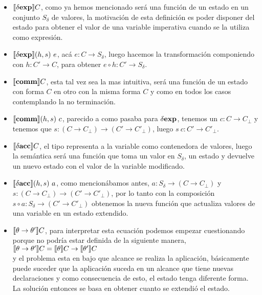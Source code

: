 \begin{itemize}
\item $\llbracket \delta \textbf{exp} \rrbracket C$, como ya hemos mencionado ser\'a una funci\'on 
de un estado en un conjunto $S_\delta$ de valores, la motivaci\'on de 
esta definici\'on es poder disponer del estado para obtener el valor de 
una variable imperativa cuando se la utiliza como expresi\'on.

\item $\llbracket \delta \textbf{exp} \rrbracket(h,s) \ e$, acá $e : C \rightarrow S_\delta$, luego
hacemos la transformaci\'on componiendo con $h : C' \rightarrow C$, para obtener
$e \circ h : C' \rightarrow S_\delta$.

\item $\llbracket \textbf{comm} \rrbracket C$, esta tal vez sea la mas intuitiva, ser\'a
una funci\'on de un estado con forma $C$ en otro con la misma forma $C$ y
como en todos los casos contemplando la no terminaci\'on.

\item $\llbracket \textbf{comm} \rrbracket(h,s) \ c$, parecido a como pasaba para $\delta \textbf{exp}$,
tenemos un $c : C \rightarrow C_\bot$ y tenemos que 
$s : (C \rightarrow C_\bot) \rightarrow (C' \rightarrow C'_\bot)$, luego
$s \ c : C' \rightarrow C'_\bot$.

\item $\llbracket \delta \textbf{acc} \rrbracket C$, el tipo representa a la variable como contenedora
de valores, luego la sem\'antica ser\'a una funci\'on que toma un valor en $S_\delta$,
un estado y devuelve un nuevo estado con el valor de la variable modificado.

\item $\llbracket \delta \textbf{acc} \rrbracket(h,s) \ a$, como mencion\'abamos antes, 
$a : S_\delta \rightarrow (C \rightarrow C_\bot)$ y
$s : (C \rightarrow C_\bot) \rightarrow (C' \rightarrow C'_\bot)$, por lo tanto
con la composici\'on $s \circ a : S_\delta \rightarrow (C' \rightarrow C'_\bot)$
obtenemos la nueva funci\'on que actualiza valores de una variable en un estado
extendido.

\item $\llbracket \theta \rightarrow \theta' \rrbracket C$, para interpretar esta ecuaci\'on
podemos empezar cuestionando porque no podr\'ia estar definida de la siguiente 
manera,\\

$\llbracket \theta \rightarrow \theta' \rrbracket C = \llbracket \theta \rrbracket C \rightarrow \llbracket \theta' \rrbracket C$\\

y el problema esta en bajo que alcance se realiza la aplicaci\'on, 
b\'asicamente puede suceder que la aplicaci\'on suceda en un alcance
que tiene nuevas declaraciones y como consecuencia de esto, el estado tenga diferente
forma. La soluci\'on entonces se basa en obtener cuanto se extendió el estado.


\end{itemize}
